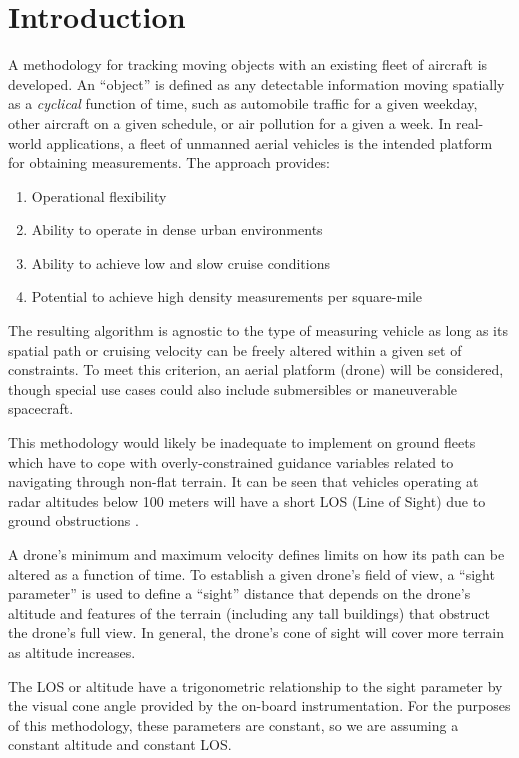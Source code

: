 \documentclass[conf]{new-aiaa}
\begin{document}
\section{Introduction}
A methodology for tracking moving objects with an existing fleet of aircraft is developed. An ``object'' is defined as any detectable information moving spatially as a \emph{cyclical} function of time, such as automobile traffic for a given weekday, other aircraft on a given schedule, or air pollution for a given a week. In real-world applications, a fleet of unmanned aerial vehicles is the intended platform for obtaining measurements. The approach provides:
\begin{enumerate}
\item Operational flexibility
\item Ability to operate in dense urban environments
\item Ability to achieve low and slow cruise conditions
\item Potential to achieve high density measurements per square-mile
\end{enumerate}

The resulting algorithm is agnostic to the type of measuring vehicle as long as its spatial path or cruising velocity can be freely altered within a given set of constraints. To meet this criterion, an aerial platform (drone) will be considered, though special use cases could also include submersibles or maneuverable spacecraft. 

This methodology would likely be inadequate to implement on ground fleets which have to cope with overly-constrained guidance variables related to navigating through non-flat terrain. It can be seen that vehicles operating at radar altitudes below 100 meters will have a short LOS (Line of Sight) due to ground obstructions \cite{amorim2017forConnectedToCellNetworks}.

A drone’s minimum and maximum velocity defines limits on how its path can be altered as a function of time. To establish a given drone’s field of view, a “sight parameter” is used to define a “sight” distance that depends on the drone’s altitude and features of the terrain (including any tall buildings) that obstruct the drone’s full view. In general, the drone’s cone of sight will cover more terrain as altitude increases. \cite{zorbas2013energyefficientmobiletracking}

The LOS or altitude have a trigonometric relationship to the sight parameter by the visual cone angle provided by the on-board instrumentation. For the purposes of this methodology, these parameters are constant, so we are assuming a constant altitude and constant LOS.
\end{document}

